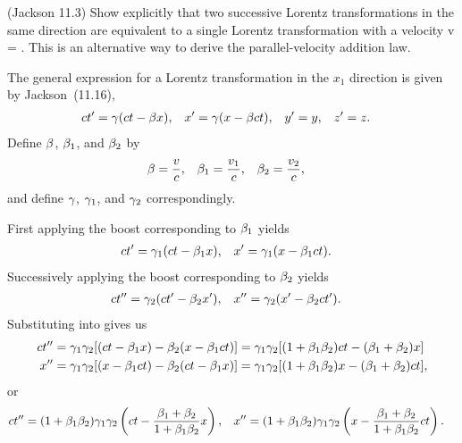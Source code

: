 \newcommand{\vq}{v_1}
\newcommand{\vw}{v_2}

\begin{statement}{(Jackson 11.3)}
	Show explicitly that two successive Lorentz transformations in the same direction are equivalent to a single Lorentz transformation with a velocity
	\beqn \label{given1}
		v = \frac{\vq + \vw}{1 + \vq \vw / c^2}.
	\eeqn
	This is an alternative way to derive the parallel-velocity addition law.
\end{statement}

\newcommand{\xo}{x_0}
\newcommand{\xq}{x_1}
\newcommand{\xw}{x_2}
\newcommand{\xe}{x_3}

\newcommand{\betq}{\bet_1}
\newcommand{\betw}{\bet_2}
\newcommand{\gamq}{\gam_1}
\newcommand{\gamw}{\gam_2}

\begin{solution}
	The general expression for a Lorentz transformation in the $\xq$ direction is given by Jackson~(11.16),
	\begin{align} \label{lorentz}
		c t' &= \gamma (ct - \beta x), &
		x' &= \gamma (x - \beta c t), &
		y' &= y, &
		z' &= z.
	\end{align}
	Define $\beta$, $\betq$, and $\betw$ by
	\begin{align*}
		\bet &= \frac{v}{c}, &
		\betq &= \frac{\vq}{c}, &
		\betw &= \frac{\vw}{c},
	\end{align*}
	and define $\gamma$, $\gamq$, and $\gamw$ correspondingly.
	
	First applying the boost corresponding to $\betq$ yields
	\begin{align} \label{boost1}
		c t' &= \gamq (c t - \betq x), &
		x' &= \gamq (x - \betq c t).
	\end{align}
	Successively applying the boost corresponding to $\betw$ yields
	\begin{align} \label{boost2}
		c t'' &= \gamw (c t' - \betw x'), &
		x'' &= \gamw (x' - \betw c t').
	\end{align}
	Substituting  into  gives us
	\begin{align*}
		c t'' &= \gamq \gamw [(c t - \betq x) - \betw (x - \betq c t)]
		= \gamq \gamw [(1 + \betq \betw) c t - (\betq + \betw) x] \\
		x'' &= \gamq \gamw [(x - \betq c t) - \betw (c t - \betq x)]
		= \gamq \gamw [(1 + \betq \betw) x - (\betq + \betw) c t],
	\end{align*}
	or
	\begin{align} \label{thing1}
		c t'' &= (1 + \betq \betw) \gamq \gamw \left( c t - \frac{\betq + \betw}{1 + \betq \betw} x \right), &
		x'' &= (1 + \betq \betw) \gamq \gamw \left( x - \frac{\betq + \betw}{1 + \betq \betw} c t \right).
	\end{align}
	

\end{solution}
